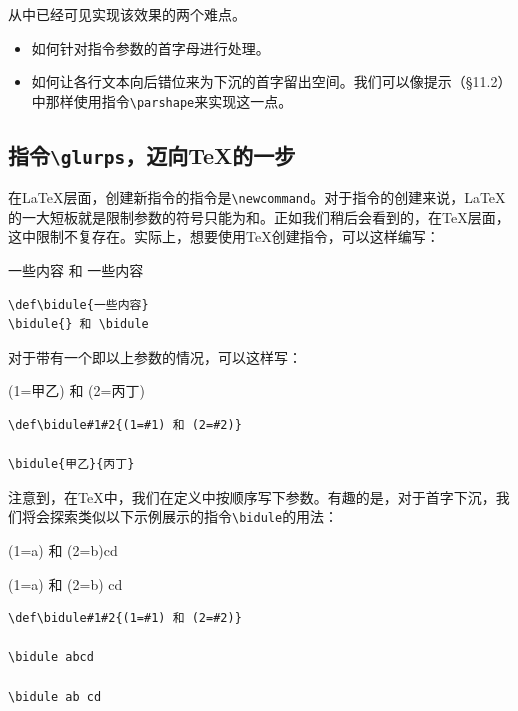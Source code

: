 从中已经可见实现该效果的两个难点。

\begin{itemize}
    \item 如何针对指令参数的首字母进行处理。
    \item 如何让各行文本向后错位来为下沉的首字留出空间。我们可以像提示（\S 11.2）中那样使用指令\verb|\parshape|来实现这一点。
\end{itemize}

\subsection{指令\texttt{\backslash glurps}，迈向\TeX 的一步}

在\LaTeX 层面，创建新指令的指令是\verb|\newcommand|。对于指令的创建来说，\LaTeX 的一大短板就是限制参数的符号只能为\dm{\{}和\dm{\}}。正如我们稍后会看到的，在\TeX 层面，这中限制不复存在。实际上，想要使用\TeX 创建指令，可以这样编写：

\begin{codelist}[11.17]{
\def\bidule{一些内容}
\bidule{} 和 \bidule
}\begin{verbatim}
\def\bidule{一些内容}
\bidule{} 和 \bidule
\end{verbatim}
\end{codelist}

对于带有一个即以上参数的情况，可以这样写：

\begin{codelist}[11.18]{
    \def\bidule#1#2{(1=#1) 和 (2=#2)}

    \bidule{甲乙}{丙丁}
}\begin{verbatim}
\def\bidule#1#2{(1=#1) 和 (2=#2)}

\bidule{甲乙}{丙丁}
\end{verbatim}
\end{codelist}

注意到，在\TeX 中，我们在定义中按顺序写下参数。有趣的是，对于首字下沉，我们将会探索类似以下示例展示的指令\verb|\bidule|的用法：

\begin{codelist}[11.19]{
    \def\bidule#1#2{(1=#1) 和 (2=#2)}

\bidule abcd

\bidule ab cd
}\begin{verbatim}
\def\bidule#1#2{(1=#1) 和 (2=#2)}

\bidule abcd

\bidule ab cd
\end{verbatim}
\end{codelist}


